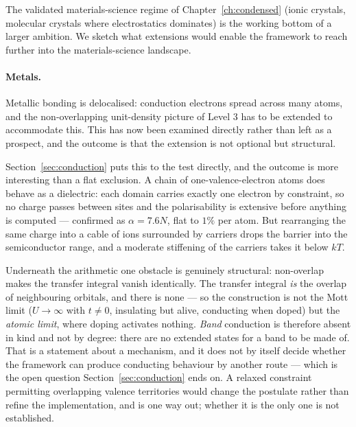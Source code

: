 The validated materials-science regime of Chapter~\ref{ch:condensed} (ionic crystals, molecular crystals where electrostatics dominates) is the working bottom of a larger ambition. We sketch what extensions would enable the framework to reach further into the materials-science landscape.

\paragraph{Metals.}
Metallic bonding is delocalised: conduction electrons spread across many atoms, and the non-overlapping unit-density picture of Level 3 has to be extended to accommodate this. This has now been examined directly rather than left as a prospect, and the outcome is that the extension is not optional but structural.

Section~\ref{sec:conduction} puts this to the test directly, and the outcome is more interesting than
a flat exclusion. A chain of one-valence-electron atoms does behave as a dielectric: each domain
carries exactly one electron by constraint, so no charge passes between sites and the polarisability
is extensive before anything is computed --- confirmed as $\alpha=7.6N$, flat to $1\%$ per atom.
But rearranging the same charge into a cable of ions surrounded by carriers drops the barrier into
the semiconductor range, and a moderate stiffening of the carriers takes it below $kT$.

Underneath the arithmetic one obstacle is genuinely structural: non-overlap makes the transfer
integral vanish identically. The transfer integral \emph{is} the overlap of neighbouring orbitals,
and there is none --- so the construction is not the Mott limit ($U\to\infty$ with $t\neq0$,
insulating but alive, conducting when doped) but the \emph{atomic limit}, where doping activates
nothing. \emph{Band} conduction is therefore absent in kind and not by degree: there are no extended
states for a band to be made of. That is a statement about a mechanism, and it does not by itself
decide whether the framework can produce conducting behaviour by another route --- which is the open
question Section~\ref{sec:conduction} ends on. A relaxed constraint permitting overlapping valence
territories would change the postulate rather than refine the implementation, and is one way out;
whether it is the only one is not established.

